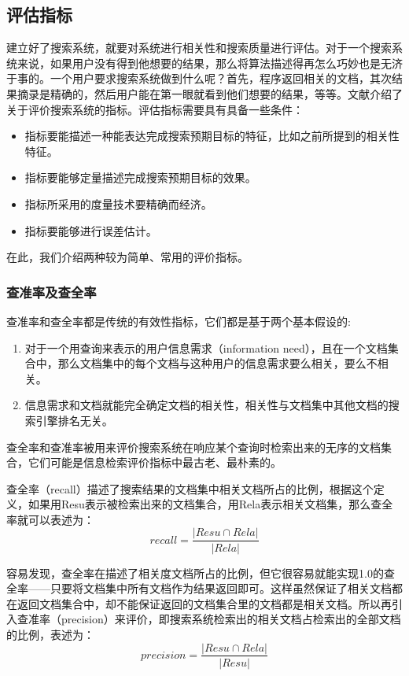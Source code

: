 \documentclass[12pt,a4paper]{article}
\begin{document}
	\subsection{评估指标}
	建立好了搜索系统，就要对系统进行相关性和搜索质量进行评估。对于一个搜索系统来说，如果用户没有得到他想要的结果，那么将算法描述得再怎么巧妙也是无济于事的。一个用户要求搜索系统做到什么呢？首先，程序返回相关的文档，其次结果摘录是精确的，然后用户能在第一眼就看到他们想要的结果，等等。文献\cite{buttcher2010information}介绍了关于评价搜索系统的指标。评估指标需要具有具备一些条件：
	\begin{itemize}
		\item
	指标要能描述一种能表达完成搜索预期目标的特征，比如之前所提到的相关性特征。
		\item
	指标要能够定量描述完成搜索预期目标的效果。
		\item
	指标所采用的度量技术要精确而经济。
		\item
	指标要能够进行误差估计。
	\end{itemize}
	在此，我们介绍两种较为简单、常用的评价指标。
		
		\subsubsection{查准率及查全率}
	查准率和查全率都是传统的有效性指标，它们都是基于两个基本假设的\cite{buttcher2010information}:
	\begin{enumerate}[1)]
		\item
	对于一个用查询来表示的用户信息需求（information need），且在一个文档集合中，那么文档集中的每个文档与这种用户的信息需求要么相关，要么不相关。
		\item
	信息需求和文档就能完全确定文档的相关性，相关性与文档集中其他文档的搜索引擎排名无关。
	\end{enumerate}
	
	查全率和查准率被用来评价搜索系统在响应某个查询时检索出来的无序的文档集合，它们可能是信息检索评价指标中最古老、最朴素的。
	
	查全率（recall）描述了搜索结果的文档集中相关文档所占的比例，根据这个定义，如果用Resu表示被检索出来的文档集合，用Rela表示相关文档集，那么查全率就可以表述为：
	\begin{equation}\label{eq:recall}
	recall = \frac{|Resu\cap Rela|}{|Rela|}
	\end{equation}
	
	容易发现，查全率在描述了相关度文档所占的比例，但它很容易就能实现1.0的查全率——只要将文档集中所有文档作为结果返回即可。这样虽然保证了相关文档都在返回文档集合中，却不能保证返回的文档集合里的文档都是相关文档。所以再引入查准率（precision）来评价，即搜索系统检索出的相关文档占检索出的全部文档的比例，表述为：
	\begin{equation}\label{eq:recall}
	precision = \frac{|Resu\cap Rela|}{|Resu|}
	\end{equation}
	
\end{document}
